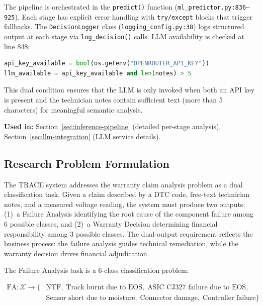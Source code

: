 \documentclass[10pt,a4paper]{article}
\begin{document}
The pipeline is orchestrated in the \texttt{predict()} function (\texttt{ml\_predictor.py:836--925}). Each stage has explicit error handling with \texttt{try/except} blocks that trigger fallbacks. The \texttt{DecisionLogger} class (\texttt{logging\_config.py:38}) logs structured output at each stage via \texttt{log\_decision()} calls. LLM availability is checked at line 848:

\begin{lstlisting}[language=Python]
api_key_available = bool(os.getenv("OPENROUTER_API_KEY"))
llm_available = api_key_available and len(notes) > 5
\end{lstlisting}

This dual condition ensures that the LLM is only invoked when both an API key is present and the technician notes contain sufficient text (more than 5 characters) for meaningful semantic analysis.

\textbf{Used in:} Section~\ref{sec:inference-pipeline} (detailed per-stage analysis), Section~\ref{sec:llm-integration} (LLM service details).

\subsection{Research Problem Formulation}
\label{sec:research-problem-formulation}

The TRACE system addresses the warranty claim analysis problem as a dual classification task. Given a claim described by a DTC code, free-text technician notes, and a measured voltage reading, the system must produce two outputs: (1)~a Failure Analysis identifying the root cause of the component failure among 6 possible classes, and (2)~a Warranty Decision determining financial responsibility among 3 possible classes. The dual-output requirement reflects the business process: the failure analysis guides technical remediation, while the warranty decision drives financial adjudication.

The Failure Analysis task is a 6-class classification problem:

\begin{equation}
\begin{split}
\text{FA}\colon \mathcal{X} \to \{&\text{NTF},\; \text{Track burnt due to EOS},\; \text{ASIC CJ327 failure due to EOS},\\
&\text{Sensor short due to moisture},\; \text{Connector damage},\; \text{Controller failure}\}
\end{split}
\label{eq:fa-mapping}
\end{equation}
\end{document}
